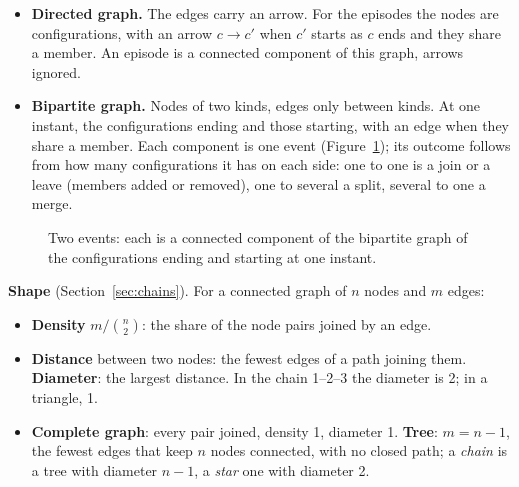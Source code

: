 \begin{itemize}
  \item \textbf{Directed graph.} The edges carry an arrow. For the episodes the nodes are
        configurations, with an arrow $c\to c'$ when $c'$ starts as $c$ ends and they share a member.
        An episode is a connected component of this graph, arrows ignored.
  \item \textbf{Bipartite graph.} Nodes of two kinds, edges only between kinds. At one instant, the
        configurations ending and those starting, with an edge when they share a member. Each
        component is one event (Figure~\ref{fig:events}); its outcome follows from how many
        configurations it has on each side: one to one is a join or a leave (members added or
        removed), one to several a split, several to one a merge.
\end{itemize}

\begin{figure}[H]
\centering
{}
\caption{Two events: each is a connected component of the bipartite graph of the configurations
ending and starting at one instant.}
\label{fig:events}
\end{figure}

\textbf{Shape} (Section~\ref{sec:chains}). For a connected graph of $n$ nodes and $m$ edges:
\begin{itemize}
  \item \textbf{Density} $m/\binom{n}{2}$: the share of the node pairs joined by an edge.
  \item \textbf{Distance} between two nodes: the fewest edges of a path joining them. \textbf{Diameter}: the
        largest distance. In the chain 1--2--3 the diameter is 2; in a triangle, 1.
  \item \textbf{Complete graph}: every pair joined, density 1, diameter 1. \textbf{Tree}: $m=n-1$, the fewest
        edges that keep $n$ nodes connected, with no closed path; a \emph{chain} is a tree with diameter
        $n-1$, a \emph{star} one with diameter 2.
\end{itemize}

